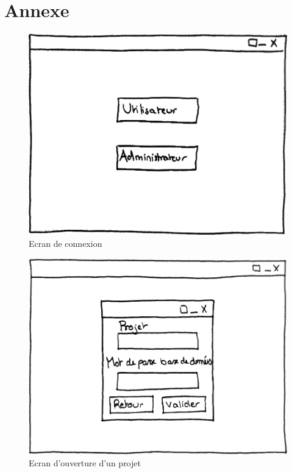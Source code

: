 \documentclass[12pt]{report}
\begin{document}
\section{Annexe}

\begin{figure}
\centering
\includegraphics[scale=0.5]{IHM_1a.png}
\caption{Ecran de connexion}
\end{figure}

\begin{figure}
\centering
\includegraphics[scale=0.5]{IHM_6a.png}
\caption{Ecran d'ouverture d'un projet}
\end{figure}
\end{document}
